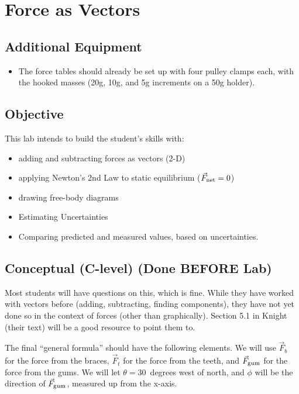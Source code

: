 \documentclass[fleqn,letterpaper]{article}
\begin{document}
\cfoot{}
\headsep=25pt

\section*{Force as Vectors}

\subsection*{Additional Equipment}

\begin{itemize}
  \item{The force tables should already be set up with four pulley clamps each, with the hooked masses (20g, 10g, and 5g increments on a 50g holder).}
\end{itemize}

\subsection*{Objective}

This lab intends to build the student's skills with:
%
\begin{itemize}
 \item{adding and subtracting forces as vectors (2-D)}
 \item{applying Newton's 2nd Law to static equilibrium ($\vec{F}_{\rm net} = 0$)}
 \item{drawing free-body diagrams}
 \item{Estimating Uncertainties}
 \item{Comparing predicted and measured values, based on uncertainties.}
\end{itemize}
%

\subsection*{Conceptual (C-level) (Done BEFORE Lab)}

Most students will have questions on this, which is fine.  While they have worked with vectors before (adding, subtracting, finding components), they have not yet done so in the context of forces (other than graphically).  Section 5.1 in Knight (their text) will be a good resource to point them to.

The final ``general formula'' should have the following elements.  We will use $\vec{F}_b$ for the force from the braces, $\vec{F}_t$ for the force from the teeth, and $\vec{F}_{\rm gum}$ for the force from the gums.  We will let $\theta = 30$~degrees west of north, and $\phi$ will be the direction of $\vec{F}_{\rm gum}$, measured up from the x-axis.
\end{document}
